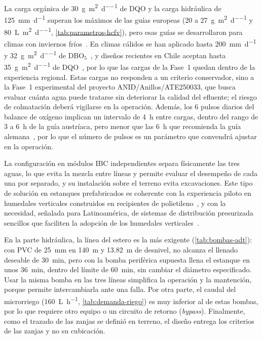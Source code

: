 La carga orgánica de \qty{30}{\gram\per\square\meter\per\day} de DQO y la carga hidráulica de \qty{125}{\milli\meter\per\day} superan los máximos de las guías europeas (20 a \qty{27}{\gram\per\square\meter\per\day} y \qty{80}{\liter\per\square\meter\per\day}, \cref{tab:parametros-hcfv}), pero esas guías se desarrollaron para climas con inviernos fríos~\parencite{dotro2021humedales}.
En climas cálidos se han aplicado hasta \qty{200}{\milli\meter\per\day} y \qty{32}{\gram\per\square\meter\per\day} de DBO$_5$~\parencite{platzer2016long}, y diseños recientes en Chile aceptan hasta \qty{35}{\gram\per\square\meter\per\day} de DQO~\parencite{vera2025atrapaniebla}, por lo que las cargas de la Fase~1 quedan dentro de la experiencia regional.
Estas cargas no responden a un criterio conservador, sino a la Fase~1 experimental del proyecto ANID/Anillos/ATE250033, que busca evaluar cuánta agua puede tratarse sin deteriorar la calidad del efluente; el riesgo de colmatación deberá vigilarse en la operación.
Además, los 6 pulsos diarios del balance de oxígeno implican un intervalo de \qty{4}{\hour} entre cargas, dentro del rango de 3 a \qty{6}{\hour} de la guía austríaca, pero menor que las \qty{6}{\hour} que recomienda la guía alemana~\parencite{dotro2021humedales}, por lo que el número de pulsos es un parámetro que convendrá ajustar en la operación.

La configuración en módulos IBC independientes separa físicamente las tres aguas, lo que evita la mezcla entre líneas y permite evaluar el desempeño de cada una por separado, y su instalación sobre el terreno evita excavaciones.
Este tipo de solución en estanques prefabricados es coherente con la experiencia piloto en humedales verticales construidos en recipientes de polietileno~\parencite{ignatowicz2023treatment}, y con la necesidad, señalada para Latinoamérica, de sistemas de distribución presurizada sencillos que faciliten la adopción de los humedales verticales~\parencite{rodriguezdominguez2020constructed}.

En la parte hidráulica, la línea del estero es la más exigente (\cref{tab:bombas-adt}): con PVC de \qty{25}{\milli\meter} en \qty{140}{\meter} y \qty{13.82}{\meter} de desnivel, no alcanza el llenado deseable de \qty{30}{\minute}, pero con la bomba periférica supuesta llena el estanque en unos \qty{36}{\minute}, dentro del límite de \qty{60}{\minute}, sin cambiar el diámetro especificado.
Usar la misma bomba en las tres líneas simplifica la operación y la mantención, porque permite intercambiarla ante una falla.
Por otra parte, el caudal del microrriego (\qty{160}{\liter\per\hour}, \cref{tab:demanda-riego}) es muy inferior al de estas bombas, por lo que requiere otro equipo o un circuito de retorno (\textit{bypass}).
Finalmente, como el trazado de las zanjas se definió en terreno, el diseño entrega los criterios de las zanjas y no su cubicación.

